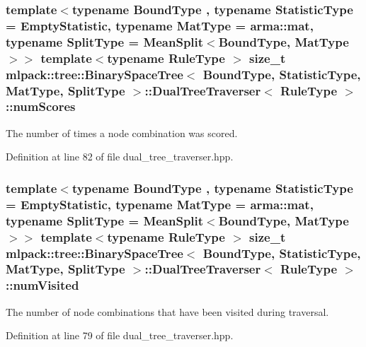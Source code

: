 \subsubsection[{num\-Scores}]{\setlength{\rightskip}{0pt plus 5cm}template$<$typename Bound\-Type , typename Statistic\-Type  = Empty\-Statistic, typename Mat\-Type  = arma\-::mat, typename Split\-Type  = Mean\-Split$<$\-Bound\-Type, Mat\-Type$>$$>$ template$<$typename Rule\-Type $>$ size\-\_\-t {\bf mlpack\-::tree\-::\-Binary\-Space\-Tree}$<$ Bound\-Type, Statistic\-Type, Mat\-Type, Split\-Type $>$\-::{\bf Dual\-Tree\-Traverser}$<$ Rule\-Type $>$\-::num\-Scores\hspace{0.3cm}{\ttfamily [private]}}\label{classmlpack_1_1tree_1_1BinarySpaceTree_1_1DualTreeTraverser_abf9b31faa63fd922615af123d645f45f}


The number of times a node combination was scored. 



Definition at line 82 of file dual\-\_\-tree\-\_\-traverser.\-hpp.

\subsubsection[{num\-Visited}]{\setlength{\rightskip}{0pt plus 5cm}template$<$typename Bound\-Type , typename Statistic\-Type  = Empty\-Statistic, typename Mat\-Type  = arma\-::mat, typename Split\-Type  = Mean\-Split$<$\-Bound\-Type, Mat\-Type$>$$>$ template$<$typename Rule\-Type $>$ size\-\_\-t {\bf mlpack\-::tree\-::\-Binary\-Space\-Tree}$<$ Bound\-Type, Statistic\-Type, Mat\-Type, Split\-Type $>$\-::{\bf Dual\-Tree\-Traverser}$<$ Rule\-Type $>$\-::num\-Visited\hspace{0.3cm}{\ttfamily [private]}}\label{classmlpack_1_1tree_1_1BinarySpaceTree_1_1DualTreeTraverser_a78bc3e243b86439b9572b7608f25c2b5}


The number of node combinations that have been visited during traversal. 



Definition at line 79 of file dual\-\_\-tree\-\_\-traverser.\-hpp.

